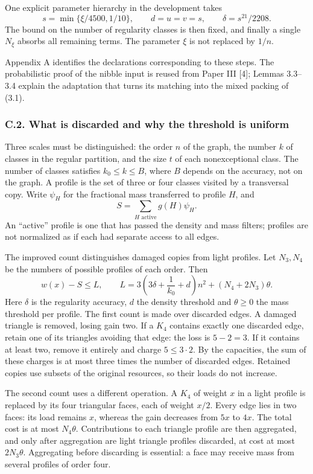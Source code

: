 \documentclass[english,11pt,a4paper]{article}
\newcounter{none}
\begin{document}
One explicit parameter hierarchy in the development takes \[
s=\min\{\xi/4500,1/10\},\qquad
d=u=v=s,\qquad \delta=s^{21}/2208.
\] The bound on the number of regularity classes is then fixed, and finally a single \(N_\xi\) absorbs all remaining terms. The parameter \(\xi\) is not replaced by \(1/n\).

Appendix A identifies the declarations corresponding to these steps. The probabilistic proof of the nibble input is reused from Paper III {[}4{]}; Lemmas 3.3--3.4 explain the adaptation that turns its matching into the mixed packing of (3.1).

\subsubsection{C.2. What is discarded and why the threshold is uniform}\label{c.2.-what-is-discarded-and-why-the-threshold-is-uniform}

Three scales must be distinguished: the order \(n\) of the graph, the number \(k\) of classes in the regular partition, and the size \(t\) of each nonexceptional class. The number of classes satisfies \(k_0\le k\le B\), where \(B\) depends on the accuracy, not on the graph. A profile is the set of three or four classes visited by a transversal copy. Write \(\psi_H\) for the fractional mass transferred to profile \(H\), and \[
S=\sum_{H\text{ active}}g(H)\psi_H.
\] An ``active'' profile is one that has passed the density and mass filters; profiles are not normalized as if each had separate access to all edges.

The improved count distinguishes damaged copies from light profiles. Let \(N_3,N_4\) be the numbers of possible profiles of each order. Then \[
w(x)-S\le L,\qquad
L=3\left(3\delta+\frac1{k_0}+d\right)n^2
  +(N_4+2N_3)\theta.
\tag{3.10}
\] Here \(\delta\) is the regularity accuracy, \(d\) the density threshold and \(\theta\ge0\) the mass threshold per profile. The first count is made over discarded edges. A damaged triangle is removed, losing gain two. If a \(K_4\) contains exactly one discarded edge, retain one of its triangles avoiding that edge: the loss is \(5-2=3\). If it contains at least two, remove it entirely and charge \(5\le3\cdot2\). By the capacities, the sum of these charges is at most three times the number of discarded edges. Retained copies use subsets of the original resources, so their loads do not increase.

The second count uses a different operation. A \(K_4\) of weight \(x\) in a light profile is replaced by its four triangular faces, each of weight \(x/2\). Every edge lies in two faces: its load remains \(x\), whereas the gain decreases from \(5x\) to \(4x\). The total cost is at most \(N_4\theta\). Contributions to each triangle profile are then aggregated, and only after aggregation are light triangle profiles discarded, at cost at most \(2N_3\theta\). Aggregating before discarding is essential: a face may receive mass from several profiles of order four.
\end{document}
